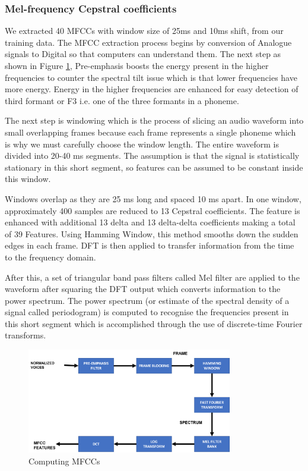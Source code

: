 \documentclass[a4paper, 11pt]{article}
\begin{document}
\subsubsection{Mel-frequency Cepstral coefficients}
\label{sub:MFCC-trg}

We extracted 40 MFCCs with  window size of 25ms and 10ms shift, from our training data. The MFCC extraction process begins by conversion of Analogue signals to Digital so that computers can understand them. The next step as shown in Figure \ref{fig:MFCCs-computation}, Pre-emphasis boosts the energy present in the higher frequencies to counter the spectral tilt issue which is that lower frequencies have more energy. Energy in the higher frequencies are enhanced for easy detection of third formant or F3 i.e. one of the three formants in a phoneme. 

The next step is windowing which is the process of slicing an audio waveform into small overlapping frames because each frame represents a single phoneme which is why we must carefully choose the window length. The entire waveform is divided into 20-40 ms segments. The assumption is that the signal is statistically stationary in this short segment, so features can be assumed to be constant inside this window. %

Windows overlap as they are 25 ms long and spaced 10 ms apart. In one window, approximately 400 samples are reduced to 13 Cepstral coefficients. The feature is enhanced with additional 13 delta and 13 delta-delta coefficients making a total of 39 Features. Using Hamming Window, this method smooths down the sudden edges in each frame. DFT is then applied to transfer information from the time to the frequency domain. 

After this, a set of triangular band pass filters called Mel filter are applied to the waveform after squaring the DFT output which converts information to the power spectrum. The power spectrum (or estimate of the spectral density of a signal called periodogram) is computed to recognise the frequencies present in this short segment which is accomplished through the use of discrete-time Fourier transforms.   

\begin{figure}[h]
    \centering
    \includegraphics[width=0.8\textwidth]{img/feature-extraction.png}
    \caption{Computing MFCCs}
    \label{fig:MFCCs-computation}
\end{figure}
\end{document}
